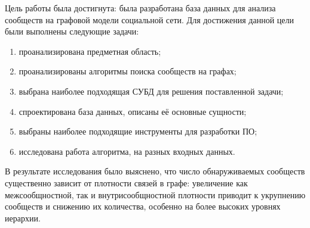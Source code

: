 
Цель работы была достигнута: была разработана база данных для анализа сообществ на графовой модели социальной сети. Для достижения данной цели были выполнены следующие задачи:

\begin{enumerate}
\item проанализирована предметная область;
\item проанализированы алгоритмы поиска сообществ на графах;
\item выбрана наиболее подходящая СУБД для решения поставленной задачи;
\item спроектирована база данных, описаны её основные сущности;
\item выбраны наиболее подходящие инструменты для разработки ПО;
\item исследована работа алгоритма, на разных входных данных.
\end{enumerate}

В результате исследования было выяснено, что число обнаруживаемых сообществ существенно зависит от плотности связей в графе: увеличение как межсообщностной, так и внутрисообщностной плотности приводит к укрупнению сообществ и снижению их количества, особенно на более высоких уровнях иерархии.